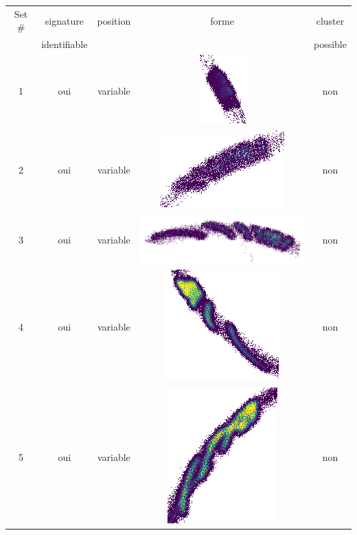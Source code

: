 \begin{table}[h]
\centering
\begin{tabular}{|c|c|c|c|c|}
\hline
Set \# & signature & position & forme & cluster\\
 & identifiable & & & possible\\
\hline
1 & oui & variable & \includegraphics[scale=0.2]{images/set12.png}  & non \\
\hline
2 & oui & variable & \includegraphics[scale=0.2]{images/set13.png}  & non \\
\hline
3 & oui & variable & \includegraphics[scale=0.35]{images/set14.png}  & non \\
\hline
4 & oui & variable & \includegraphics[scale=0.2]{images/set15.png}  & non \\
\hline
5 & oui & variable & \includegraphics[scale=0.2]{images/set16.png}  & non \\

\end{tabular}
\end{table}
